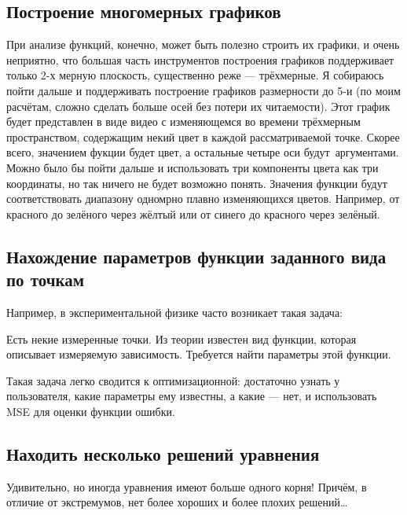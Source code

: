 \documentclass[11pt]{article}
\begin{document}
    \subsection{Построение многомерных графиков}
    При анализе функций, конечно, может быть полезно строить их графики, и очень неприятно,
    что большая часть инструментов построения графиков поддерживает только 2-х мерную плоскость,
    существенно реже — трёхмерные.
    Я собираюсь пойти дальше и поддерживать построение графиков размерности до 5-и (по моим расчётам, сложно сделать больше осей без потери их читаемости).
    Этот график будет представлен в виде видео с изменяющемся во времени трёхмерным пространством, содержащим некий цвет в каждой рассматриваемой точке.
    Скорее всего, значением фукции будет цвет, а остальные четыре оси будут аргументами.
    Можно было бы пойти дальше и использовать три компоненты цвета как три координаты, но так ничего не будет возможно понять.
    Значения функции будут соответствовать диапазону одномрно плавно изменяющихся цветов.
    Например, от красного до зелёного через жёлтый или от синего до красного через зелёный.

    \subsection{Нахождение параметров функции заданного вида по точкам}
    Например, в экспериментальной физике часто возникает такая задача:

    Есть некие измеренные точки.
    Из теории известен вид функции, которая описывает измеряемую зависимость.
    Требуется найти параметры этой функции.

    Такая задача легко сводится к оптимизационной: достаточно узнать у пользователя, какие параметры ему известны,
    а какие — нет, и использовать MSE для оценки функции ошибки.

    \subsection{Находить несколько решений уравнения}
    Удивительно, но иногда уравнения имеют больше одного корня!
    Причём, в отличие от экстремумов, нет более хороших и более плохих решений…
\end{document}
